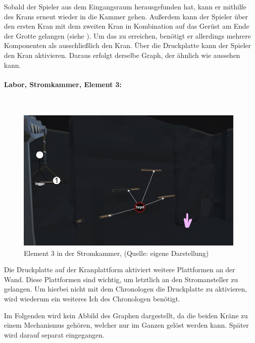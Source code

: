 Sobald der Spieler aus dem Eingangsraum herausgefunden hat, kann er mithilfe des Krans erneut wieder in die Kammer gehen. Außerdem kann der Spieler über den ersten Kran mit dem zweiten Kran in Kombination auf das Gerüst am Ende der Grotte gelangen (siehe ). Um das zu erreichen, benötigt er allerdings mehrere Komponenten als ausschließlich den Kran. Über die Druckplatte kann der Spieler den Kran aktivieren. Daraus erfolgt derselbe Graph, der ähnlich wie  aussehen kann.
\newpage
\paragraph{Labor, Stromkammer, Element 3:}\label{p:lse3}
~
\begin{figure}[ht]
\centering
\includegraphics[width=0.8\linewidth]{content/pictures/Raetsel-L02_R01_R03.jpg}
\caption{Element 3 in der Stromkammer, (Quelle: eigene Darstellung)}
\label{fig:L02_R01_R03}
\end{figure}

Die Druckplatte auf der Kranplattform aktiviert weitere Plattformen an der Wand. Diese Plattformen sind wichtig, um letztlich an den Stromansteller zu gelangen. Um hierbei nicht mit dem Chronologen die Druckplatte zu aktivieren, wird wiederum ein weiteres Ich des Chronologen benötigt. 

Im Folgenden wird kein Abbild des Graphen dargestellt, da die beiden Kräne zu einem Mechanismus gehören, welcher nur im Ganzen gelöst werden kann. Später wird darauf separat eingegangen.

